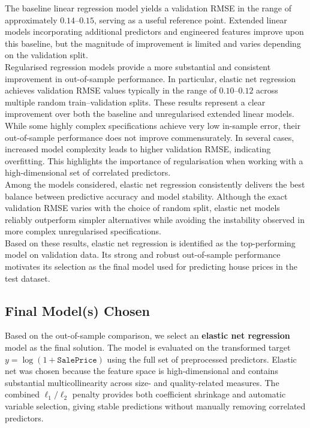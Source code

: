 \documentclass[12pt,oneside]{article} %
\begin{document}
\noindent
The baseline linear regression model yields a validation RMSE in the range of approximately $0.14$--$0.15$, serving as a useful reference point. Extended linear models incorporating additional predictors and engineered features improve upon this baseline, but the magnitude of improvement is limited and varies depending on the validation split.\\

\noindent
Regularised regression models provide a more substantial and consistent improvement in out-of-sample performance. In particular, elastic net regression achieves validation RMSE values typically in the range of $0.10$--$0.12$ across multiple random train--validation splits. These results represent a clear improvement over both the baseline and unregularised extended linear models.\\

\noindent
While some highly complex specifications achieve very low in-sample error, their out-of-sample performance does not improve commensurately. In several cases, increased model complexity leads to higher validation RMSE, indicating overfitting. This highlights the importance of regularisation when working with a high-dimensional set of correlated predictors.\\

\noindent
Among the models considered, elastic net regression consistently delivers the best balance between predictive accuracy and model stability. Although the exact validation RMSE varies with the choice of random split, elastic net models reliably outperform simpler alternatives while avoiding the instability observed in more complex unregularised specifications.\\

\noindent
Based on these results, elastic net regression is identified as the top-performing model on validation data. Its strong and robust out-of-sample performance motivates its selection as the final model used for predicting house prices in the test dataset.

\subsection{Final Model(s) Chosen}

\noindent
Based on the out-of-sample comparison, we select an \textbf{elastic net regression} model as the final solution. The model is evaluated on the transformed target $y=\log(1+\texttt{SalePrice})$ using the full set of preprocessed predictors. Elastic net was chosen because the feature space is high-dimensional and contains substantial multicollinearity across size- and quality-related measures. The combined $\ell_1/\ell_2$ penalty provides both coefficient shrinkage and automatic variable selection, giving stable predictions without manually removing correlated predictors. \\
\noindent
\end{document}
